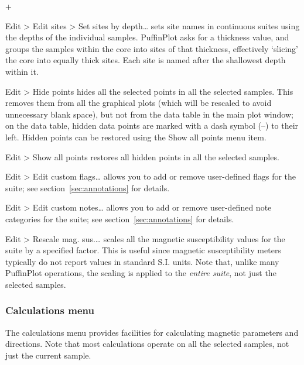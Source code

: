 \documentclass[a4paper,british]{article}
\newcommand{\menuitemlabel}[1]{%
\mbox{\textsf{#1}}\hfil}
\newenvironment{menuitemlist}%
{\begin{list}{}{%
\renewcommand{\makelabel}{\menuitemlabel}%
\setlength{\labelwidth}{35pt}%
\setlength{\leftmargin}%
             {\labelwidth+\labelsep}}}%
{\end{list}}
\newcommand{\ppcmd}[1]{\textsf{#1}} %
\newcommand{\submenu}{ \textgreater{} } %
\begin{document}
\begin{menuitemlist}
\item[Edit\submenu Edit sites\submenu Set sites by depth\ldots] sets site
  names in continuous suites using the depths of the individual samples.
  PuffinPlot asks for a thickness value, and groups the samples within the
  core into sites of that thickness, effectively `slicing' the core into
  equally thick sites. Each site is named after the shallowest depth within
  it.

\item[Edit\submenu Hide points] hides all the selected points in all the
  selected samples. This removes them from all the graphical plots (which
  will be rescaled to avoid unnecessary blank space), but not from the data
  table in the main plot window; on the data table, hidden data points are
  marked with a dash symbol (--) to their left. Hidden points can be restored
  using the \ppcmd{Show all points} menu item.

\item[Edit\submenu Show all points] restores all hidden points in all the
  selected samples.

\item[Edit\submenu Edit custom flags\ldots] allows you to add or remove
  user-defined flags for the suite; see section~\ref{sec:annotations} for
  details.

\item[Edit\submenu Edit custom notes\ldots] allows you to add or remove
  user-defined note categories for the suite; see
  section~\ref{sec:annotations} for details.

\item[Edit\submenu Rescale mag. sus.\ldots] scales all the magnetic
  susceptibility values for the suite by a specified factor. This is useful
  since magnetic susceptibility meters typically do not report values in
  standard S.I. units. Note that, unlike many PuffinPlot operations, the
  scaling is applied to the {\em entire suite}, not just the selected
  samples.

\end{menuitemlist}

\subsubsection{\label{sec:functions-calcs}Calculations menu}

The calculations menu provides facilities for calculating magnetic
parameters and directions. Note that most calculations operate on
all the selected samples, not just the current sample.
\end{document}

